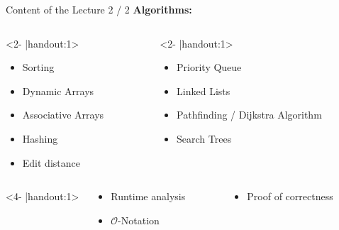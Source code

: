 \begin{frame}{Content of the Lecture 2 / 2}
  \textbf{Algorithms:}
  \begin{columns}
    \begin{column}{0.40\textwidth}<2- |handout:1>
      \begin{itemize}
        \item
          Sorting
        \item
          Dynamic Arrays
        \item
          Associative Arrays
        \item
          Hashing
        \item
          Edit distance
      \end{itemize}
    \end{column}
    \begin{column}{0.60\textwidth}<2- |handout:1>
      \begin{itemize}
        \item
          Priority Queue
        \item
          Linked Lists
        \item
          Pathfinding / Dijkstra Algorithm
        \item
          Search Trees
      \end{itemize}
    \end{column}
  \end{columns}
  \vspace*{2.0em}
  \begin{columns}<4- |handout:1>
    \begin{column}{0.40\textwidth}
      \begin{itemize}
        \item
          Runtime analysis
        \item
          $\mathcal{O}$-Notation
      \end{itemize}
    \end{column}
    \begin{column}{0.60\textwidth}
      \begin{itemize}
        \item
          Proof of correctness
          \vspace*{1.5em}
      \end{itemize}
    \end{column}
  \end{columns}
\end{frame}

